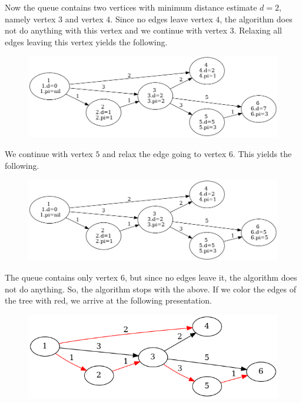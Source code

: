 Now the queue contains two vertices with minimum distance estimate $d=2$, namely vertex $3$ and vertex $4$. Since no edges leave vertex $4$, the algorithm does not do anything with this vertex and we continue with vertex $3$. Relaxing all edges leaving this vertex yields the following.

\begin{figure}[H]
\centering
\includegraphics[scale=0.4]{images/dijkstra_5.png}
\end{figure}

We continue with vertex $5$ and relax the edge going to vertex $6$. This yields the following.

\begin{figure}[H]
\centering
\includegraphics[scale=0.4]{images/dijkstra_6.png}
\end{figure}

The queue contains only vertex $6$, but since no edges leave it, the algorithm does not do anything. So, the algorithm stops with the above. If we color the edges of the tree with red, we arrive at the following presentation.

\begin{figure}[H]
\centering
\includegraphics[scale=0.5]{images/sssp_2.png}
\end{figure}




